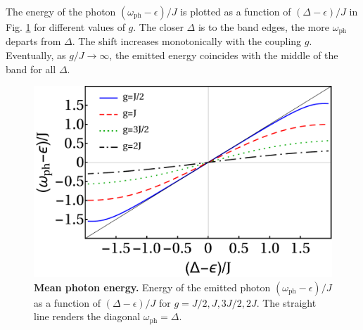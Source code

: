 \documentclass[aps,pra,twocolumn,floatfix,superscriptaddress]{revtex4-1}%
\begin{document}
The energy of the photon $(\omega_\text{ph}-\epsilon)/J$ is plotted as a function of $(\Delta-\epsilon)/J$ in Fig. \ref{fig:E_ph} for different values of $g$. The closer $\Delta$ is to the band edges, the more $\omega_\text{ph}$ departs from $\Delta$.
The shift increases monotonically with the coupling $g$. Eventually, as $g/J\to\infty$, the emitted energy coincides with the middle of the band for all $\Delta$.


\begin{figure}[thb!]
\includegraphics[width=1.0\columnwidth]{E_ph_vs_delta.pdf}
\caption{{\bf Mean photon energy.} Energy of the emitted photon $(\omega_\text{ph}-\epsilon)/J$ as a function of $(\Delta-\epsilon)/J$ for $g=J/2,J,3J/2,2J$. The straight line renders the diagonal $\omega_\text{ph}=\Delta$.%
}\label{fig:E_ph}
\end{figure}
\end{document}
